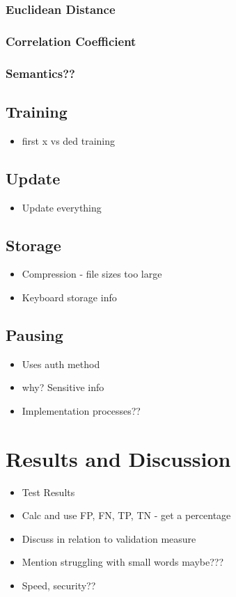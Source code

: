 \documentclass[10pt,a4paper]{report}
\begin{document}
\subsection{Euclidean Distance}
\subsection{Correlation Coefficient}
\subsection{Semantics??}
\section{Training}
\begin{itemize}
	\item first x vs ded training
\end{itemize}
\section{Update}
\begin{itemize}
	\item Update everything
\end{itemize}
\section{Storage}
\begin{itemize}
	\item Compression - file sizes too large
	\item Keyboard storage info
\end{itemize}
\section{Pausing}
\begin{itemize}
	\item Uses auth method
	\item why? Sensitive info
	\item Implementation processes??
\end{itemize}
\chapter{Results and Discussion}
\begin{itemize}
	\item Test Results
	\item Calc and use FP, FN, TP, TN - get a percentage
	\item Discuss in relation to validation measure
	\item Mention struggling with small words maybe???
	\item Speed, security??
\end{itemize}
\end{document}
